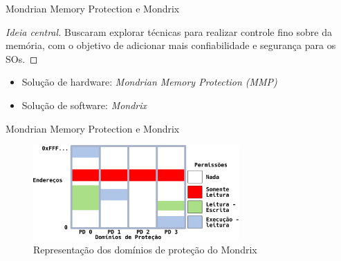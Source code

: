 \documentclass[xcolor={usenames,svgnames,dvipsnames},brazil,english,12pt,aspectratio=149]{beamer}
\begin{document}
\begin{frame}{Mondrian Memory Protection e Mondrix}

  \begin{proof}[Ideia central]
Buscaram explorar técnicas para realizar controle fino sobre da memória, com o
objetivo de adicionar mais confiabilidade e segurança para os SOs.
  \end{proof}

  \begin{itemize}
    \item Solução de hardware: \emph{Mondrian Memory Protection (MMP)}
    \item Solução de software: \emph{Mondrix}
  \end{itemize}

\end{frame}


\begin{frame}{Mondrian Memory Protection e Mondrix}
  \begin{figure}[!h]
    \centering
    \includegraphics[width=0.7\textwidth]{mondrix_pd}
    \caption*{Representação dos domínios de proteção do Mondrix}
  \end{figure}
\end{frame}
\end{document}
